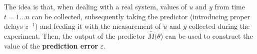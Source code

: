 The idea is that, when dealing with a real system, values of $ u$ and $ y$ from time $t=1...n$ can be collected, subsequently taking the predictor (introducing proper delays $ z^{-1}$) and feeding it with the measurement of $ u$ and $ y$ collected during the experiment. Then, the output of the predictor $ \hat{M}( \theta $) can be used to construct the value of the \textbf{prediction error} $ \varepsilon $. 






\begin{tikzpicture}[x=0.75pt,y=0.75pt,yscale=-1,xscale=1]


\end{tikzpicture}
